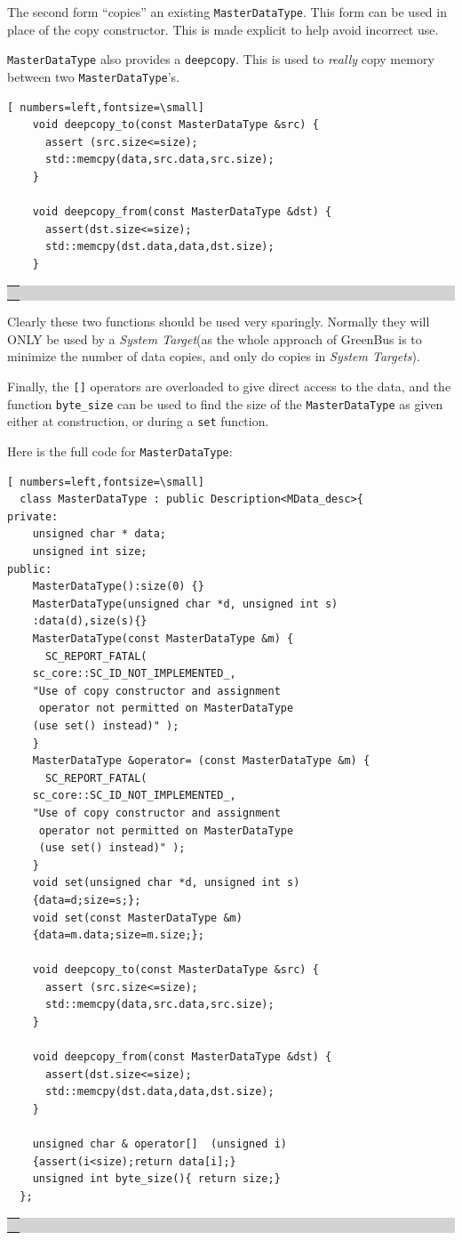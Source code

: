 \documentclass[12pt,oneside]{gsbook}
\newcommand{\slave}{{\em System Target}\xspace}
\newcommand{\slaves}{{\em System Targets}\xspace}
\def\example#1{\begin{center}\colorbox{lightgrey}{\begin{tabular}{|p{0.6\paperwidth}|}\hline\\#1\\ \\ \hline\end{tabular}}\end{center}}
\newenvironment{exampleenv}{\begin{lrbox}{\examplebox}\begin{minipage}{0.6\paperwidth}}{\end{minipage}\end{lrbox}\example{\usebox{\examplebox}}}
\begin{document}
The second form ``copies'' an existing {\tt MasterDataType}. This form
can be used in place of the copy constructor. This is made explicit to
help avoid incorrect use.

{\tt MasterDataType} also provides a {\tt deepcopy}. This is used to
{\em really} copy memory between two {\tt MasterDataType}'s. 

\begin{exampleenv}
\begin{Verbatim}[ numbers=left,fontsize=\small]
    void deepcopy_to(const MasterDataType &src) {
      assert (src.size<=size);
      std::memcpy(data,src.data,src.size);
    }

    void deepcopy_from(const MasterDataType &dst) {
      assert(dst.size<=size);
      std::memcpy(dst.data,data,dst.size);
    }
\end{Verbatim}
\end{exampleenv}

Clearly these two functions should be used very sparingly. Normally
they will ONLY be used by a \slave (as the whole approach of GreenBus
is to minimize the number of data copies, and only do copies in \slaves).

Finally,  the {\tt []} operators are overloaded to give direct access
to the data, and the function {\tt byte\_size} can be used to find the
size of the {\tt MasterDataType} as given either at construction, or
during a {\tt set} function.

Here is the full code for {\tt MasterDataType}:
\begin{exampleenv}
\begin{Verbatim}[ numbers=left,fontsize=\small]
  class MasterDataType : public Description<MData_desc>{
private:
    unsigned char * data;
    unsigned int size;
public:
    MasterDataType():size(0) {}
    MasterDataType(unsigned char *d, unsigned int s)
	:data(d),size(s){}
    MasterDataType(const MasterDataType &m) {
      SC_REPORT_FATAL( 
	sc_core::SC_ID_NOT_IMPLEMENTED_, 
	"Use of copy constructor and assignment
	 operator not permitted on MasterDataType 
	(use set() instead)" );
    }
    MasterDataType &operator= (const MasterDataType &m) {
      SC_REPORT_FATAL( 
	sc_core::SC_ID_NOT_IMPLEMENTED_, 
	"Use of copy constructor and assignment
	 operator not permitted on MasterDataType
	 (use set() instead)" );
    }
    void set(unsigned char *d, unsigned int s)
	{data=d;size=s;};
    void set(const MasterDataType &m)
	{data=m.data;size=m.size;};
      
    void deepcopy_to(const MasterDataType &src) {
      assert (src.size<=size);
      std::memcpy(data,src.data,src.size);
    }

    void deepcopy_from(const MasterDataType &dst) {
      assert(dst.size<=size);
      std::memcpy(dst.data,data,dst.size);
    }

    unsigned char & operator[]  (unsigned i) 
	{assert(i<size);return data[i];}
    unsigned int byte_size(){ return size;}
  };
\end{Verbatim}
\end{exampleenv}
\end{document}
